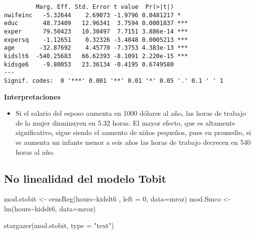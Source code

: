 \documentclass[
  letterpaper,
  DIV=11,
  numbers=noendperiod]{scrreprt}
\newenvironment{Shaded}{\begin{snugshade}}{\end{snugshade}}
\newcommand{\AttributeTok}[1]{\textcolor[rgb]{0.40,0.45,0.13}{#1}}
\newcommand{\DecValTok}[1]{\textcolor[rgb]{0.68,0.00,0.00}{#1}}
\newcommand{\FunctionTok}[1]{\textcolor[rgb]{0.28,0.35,0.67}{#1}}
\newcommand{\NormalTok}[1]{\textcolor[rgb]{0.00,0.23,0.31}{#1}}
\newcommand{\OtherTok}[1]{\textcolor[rgb]{0.00,0.23,0.31}{#1}}
\newcommand{\SpecialCharTok}[1]{\textcolor[rgb]{0.37,0.37,0.37}{#1}}
\newcommand{\StringTok}[1]{\textcolor[rgb]{0.13,0.47,0.30}{#1}}
\providecommand{\tightlist}{%
  \setlength{\itemsep}{0pt}\setlength{\parskip}{0pt}}\usepackage{longtable,booktabs,array}
\begin{document}
\begin{verbatim}
         Marg. Eff. Std. Error t value  Pr(>|t|)    
nwifeinc   -5.32644    2.69073 -1.9796 0.0481217 *  
educ       48.73409   12.96341  3.7594 0.0001837 ***
exper      79.50423   10.30497  7.7151 3.886e-14 ***
expersq    -1.12651    0.32326 -3.4848 0.0005213 ***
age       -32.87692    4.45770 -7.3753 4.383e-13 ***
kidslt6  -540.25683   66.62393 -8.1091 2.220e-15 ***
kidsge6    -9.80053   23.36134 -0.4195 0.6749580    
---
Signif. codes:  0 '***' 0.001 '**' 0.01 '*' 0.05 '.' 0.1 ' ' 1
\end{verbatim}

\textbf{Interpretaciones}

\begin{itemize}
\tightlist
\item
  Si el salario del esposo aumenta en 1000 dólares al año, las horas de
  trabajo de la mujer disminuyen en 5.32 horas. El mayor efecto, que es
  altamente significativo, sigue siendo el aumento de niños pequeños,
  pues en promedio, si se aumenta un infante menor a seis años las horas
  de trabajo decrecen en 540 horas al año.
\end{itemize}

\subsection{No linealidad del modelo
Tobit}\label{no-linealidad-del-modelo-tobit}

\begin{Shaded}
\begin{Highlighting}[]
\NormalTok{mod.stobit }\OtherTok{\textless{}{-}} \FunctionTok{censReg}\NormalTok{(hours}\SpecialCharTok{\textasciitilde{}}\NormalTok{kidslt6 , }
                      \AttributeTok{left =} \DecValTok{0}\NormalTok{,}
                      \AttributeTok{data=}\NormalTok{mroz)}
\NormalTok{mod.Smco }\OtherTok{\textless{}{-}} \FunctionTok{lm}\NormalTok{(hours}\SpecialCharTok{\textasciitilde{}}\NormalTok{kidslt6, }
               \AttributeTok{data=}\NormalTok{mroz)}

\FunctionTok{stargazer}\NormalTok{(mod.stobit, }\AttributeTok{type =} \StringTok{"text"}\NormalTok{)}
\end{Highlighting}
\end{Shaded}
\end{document}
